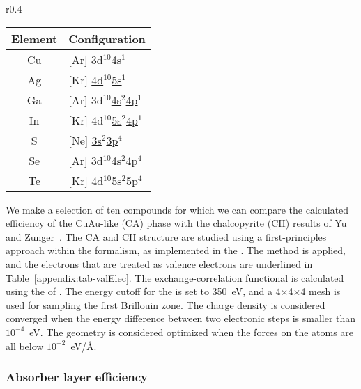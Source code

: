 \begin{refsection}
\begin{wraptable}[13]{r}{0.4\textwidth} \vspace{-2.5em}
\centering 
\renewcommand{\arraystretch}{1.2} 
\captionsetup{width=0.36\textwidth}
\caption{Electron configuration of the atoms.} 
\label{appendix:tab-valElec}
\begin{tabular}{c@{\hskip 1 em}l}\hline 
Element & Configuration \\\hline 
Cu & [Ar] \underline{3d$^{10}$4s$^1$} \\ 
Ag & [Kr] \underline{4d$^{10}$5s$^1$} \\ 
Ga & [Ar] 3d$^{10}$\underline{4s$^2$4p$^1$}\\ 
In & [Kr] 4d$^{10}$\underline{5s$^{2}$4p$^1$} \\ 
S  & [Ne] \underline{3s$^2$3p$^4$} \\ 
Se & [Ar] 3d$^{10}$\underline{4s$^{2}$4p$^4$} \\ 
Te & [Kr] 4d$^{10}$\underline{5s$^2$5p$^4$}\\ 
\hline 
\end{tabular} 
\end{wraptable} 
We make a selection of ten compounds for which we can compare the calculated 
efficiency of the CuAu-like (CA) phase with the chalcopyrite (CH) results of 
Yu and Zunger~\cite{Yu2012}. The CA and CH structure are studied using a 
first-principles approach within the  formalism, as implemented in 
the . The  method is applied, and the electrons that 
are treated as valence electrons are underlined in 
Table~\ref{appendix:tab-valElec}. The exchange-correlation functional is 
calculated using the  of . The energy cutoff for the 
 is set to 350~\si{\electronvolt}, and a 
4$\times$4$\times$4  mesh is used for sampling the first Brillouin 
zone. The charge density is considered converged when the energy difference 
between two electronic steps is smaller than $10^{-4}$~\si{\electronvolt}. 
The geometry is considered optimized when the forces on the atoms are all 
below $10^{-2}$~\si{\electronvolt}/\si{\angstrom}.

\subsubsection{Absorber layer efficiency} \label{appendix:sec-solar_efficiency}


\end{refsection}
